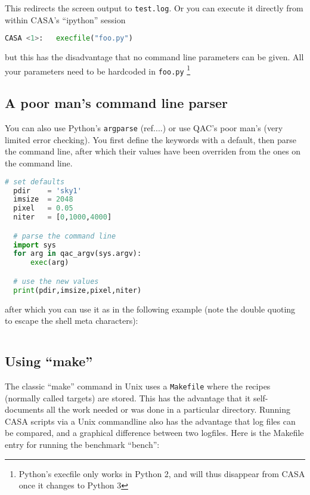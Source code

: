 \documentclass[12pt,a4paper]{article}
\begin{document}
This redirects the screen output to \verb+test.log+.  Or you can execute it directly from within CASA's ``ipython'' session

\begin{lstlisting}[language=Python]
CASA <1>:   execfile("foo.py")
\end{lstlisting}

but this has the disadvantage that no command line parameters can be given. All your parameters need to be hardcoded
in \verb+foo.py+ \footnote{Python's execfile only works in Python 2, and will thus disappear from CASA once it changes to Python 3}

\subsection{A poor man's command line parser}

You can also use Python's {\tt argparse}   (ref....) or use QAC's poor man's (very limited error checking).  You first define
the keywords with a default, then parse the command line, after which their values have been overriden from the ones on
the command line.

\begin{lstlisting}[language=Python]
  # set defaults
  pdir    = 'sky1'
  imsize  = 2048
  pixel   = 0.05
  niter   = [0,1000,4000]

  # parse the command line
  import sys
  for arg in qac_argv(sys.argv):   
      exec(arg)

  # use the new values
  print(pdir,imsize,pixel,niter)

\end{lstlisting}

after which you can use it as in the following example (note the double quoting to escape the shell meta characters):

\begin{lstlisting}[language=bash]
  % casa --nogui -c foo.py pdir='"test1"' imsize=1024 pixel=0.1 niter='[0,1000]'  > test1.log 2>&1
\end{lstlisting}

\subsection{Using ``make''}

The classic ``make'' command in Unix uses a \verb+Makefile+ where the recipes (normally called targets) are stored. This has the advantage that
it self-documents all the work needed or was done in a particular directory. Running CASA scripts via a Unix commandline also has the
advantage that log files can be compared, and a  graphical difference between two logfiles.
Here is the Makefile entry for running the benchmark ``bench'':
\end{document}
